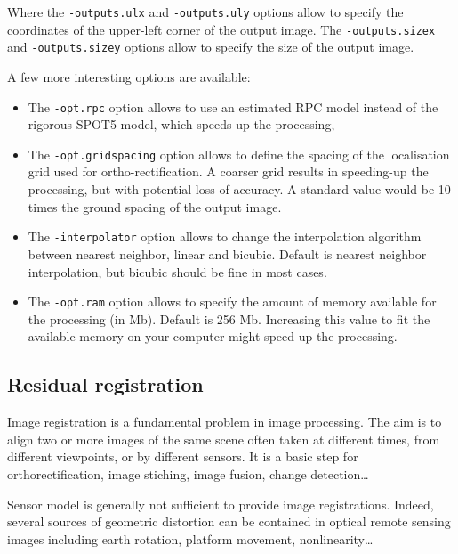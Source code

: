 Where the \verb?-outputs.ulx? and \verb?-outputs.uly? options allow to 
specify the coordinates of the upper-left corner of the output image.
The \verb?-outputs.sizex? and \verb?-outputs.sizey? options allow to 
specify the size of the output image.

A few more interesting options are available:
\begin{itemize}
\item The \verb?-opt.rpc? option allows to use an estimated RPC model
  instead of the rigorous SPOT5 model, which speeds-up the processing,
\item The \verb?-opt.gridspacing? option allows to define the spacing of the
  localisation grid used for ortho-rectification. A coarser grid
  results in speeding-up the processing, but with potential loss of
  accuracy. A standard value would be 10 times the ground spacing of 
  the output image.
\item The \verb?-interpolator? option allows to change the interpolation
  algorithm between nearest neighbor, linear and bicubic. Default is nearest 
  neighbor interpolation, but bicubic should be fine in most cases.
\item The \verb?-opt.ram? option allows to specify the amount of memory
  available for the processing (in Mb). Default is 256 Mb. Increasing
  this value to fit the available memory on your computer might
  speed-up the processing.
\end{itemize}


\subsection{Residual registration}\label{ssec:registration}

Image registration is a fundamental problem in image processing. The aim is to
align two or more images of the same scene often taken at different times, from
different viewpoints, or by different sensors. It is a basic step for
orthorectification, image stiching, image fusion, change detection\ldots

Sensor model is generally not sufficient to provide image registrations. Indeed,
several sources of geometric distortion can be contained in optical remote
sensing images including earth rotation, platform movement, nonlinearity\ldots

